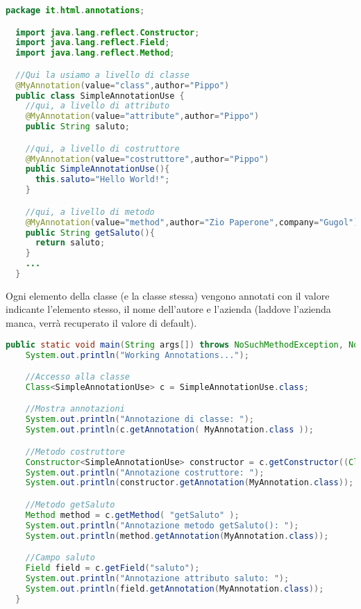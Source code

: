 \documentclass[a4paper,12pt,twoside]{book}
\begin{document}
\begin{lstlisting}[caption={Una classe che usa l'annotazione}, label={lst:usaAnnotazione}, language=Java]
  package it.html.annotations;

  import java.lang.reflect.Constructor;
  import java.lang.reflect.Field;
  import java.lang.reflect.Method;

  //Qui la usiamo a livello di classe
  @MyAnnotation(value="class",author="Pippo")
  public class SimpleAnnotationUse {
    //qui, a livello di attributo
    @MyAnnotation(value="attribute",author="Pippo")
    public String saluto;

    //qui, a livello di costruttore
    @MyAnnotation(value="costruttore",author="Pippo")
    public SimpleAnnotationUse(){
      this.saluto="Hello World!";
    }

    //qui, a livello di metodo
    @MyAnnotation(value="method",author="Zio Paperone",company="Gugol")
    public String getSaluto(){
      return saluto;
    }
    ...
  }


\end{lstlisting}

Ogni elemento della classe (e la classe stessa) vengono annotati con
il valore indicante l'elemento stesso, il nome dell'autore e l'azienda
(laddove l'azienda manca, verrà recuperato il valore di default).


\begin{lstlisting}[caption={Classe che fa introspezione della classe, dei metodi e degli attributi}, label={lst:Introspezione}, language=Java]
  public static void main(String args[]) throws NoSuchMethodException, NoSuchFieldException{
    System.out.println("Working Annotations...");

    //Accesso alla classe
    Class<SimpleAnnotationUse> c = SimpleAnnotationUse.class;

    //Mostra annotazioni
    System.out.println("Annotazione di classe: ");
    System.out.println(c.getAnnotation( MyAnnotation.class ));

    //Metodo costruttore
    Constructor<SimpleAnnotationUse> constructor = c.getConstructor((Class[]) null);
    System.out.println("Annotazione costruttore: ");
    System.out.println(constructor.getAnnotation(MyAnnotation.class));

    //Metodo getSaluto
    Method method = c.getMethod( "getSaluto" );
    System.out.println("Annotazione metodo getSaluto(): ");
    System.out.println(method.getAnnotation(MyAnnotation.class));

    //Campo saluto
    Field field = c.getField("saluto");
    System.out.println("Annotazione attributo saluto: ");
    System.out.println(field.getAnnotation(MyAnnotation.class));
  }  
\end{lstlisting}
\end{document}
